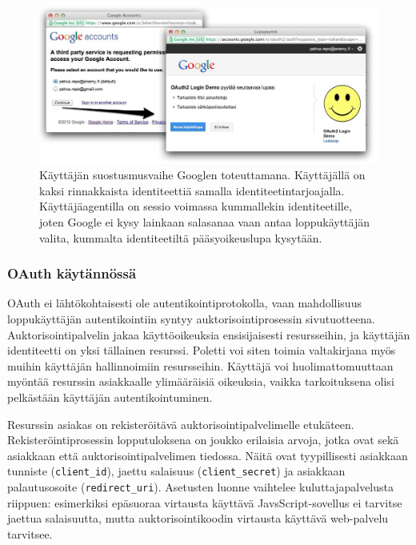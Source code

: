 \documentclass[finnish,gradu]{tktltiki}
\begin{document}


  \begin{figure}
    \centering
    \includegraphics[width=1.0\textwidth]{images/google_id_and_user_consent.jpg}
    \caption{Käyttäjän suostusmusvaihe Googlen toteuttamana. Käyttäjällä on kaksi rinnakkaista identiteettiä samalla identiteetintarjoajalla. Käyttäjäagentilla on sessio voimassa kummallekin identiteetille, joten Google ei kysy lainkaan salasanaa vaan antaa loppukäyttäjän valita, kummalta identiteetiltä pääsyoikeuslupa kysytään.}
    \label{fig:google_id_and_user_consent}
  \end{figure}


  \subsubsection{OAuth käytännössä} %
  \label{ssub:oauth_käytännössä}

  OAuth ei lähtökohtaisesti ole autentikointiprotokolla, vaan mahdollisuus loppukäyttäjän autentikointiin syntyy auktorisointiprosessin sivutuotteena. Auktorisointipalvelin jakaa käyttöoikeuksia ensisijaisesti resursseihin, ja käyttäjän identiteetti on yksi tällainen resurssi. Poletti voi siten toimia valtakirjana myös muihin käyttäjän hallinnoimiin resursseihin. Käyttäjä voi huolimattomuuttaan myöntää resurssin asiakkaalle ylimääräisiä oikeuksia, vaikka tarkoituksena olisi pelkästään käyttäjän autentikointuminen.

   Resurssin asiakas on rekisteröitävä auktorisointipalvelimelle etukäteen. Rekisteröintiprosessin lopputuloksena on joukko erilaisia arvoja, jotka ovat sekä asiakkaan että auktorisointipalvelimen tiedossa. Näitä ovat tyypillisesti asiakkaan tunniste (\verb!client_id!), jaettu salaisuus (\verb!client_secret!) ja asiakkaan palautusosoite (\verb!redirect_uri!). Asetusten luonne vaihtelee kuluttajapalvelusta riippuen: esimerkiksi epäsuoraa virtausta käyttävä JavsScript-sovellus ei tarvitse jaettua salaisuutta, mutta auktorisointikoodin virtausta käyttävä web-palvelu tarvitsee.
\end{document}
